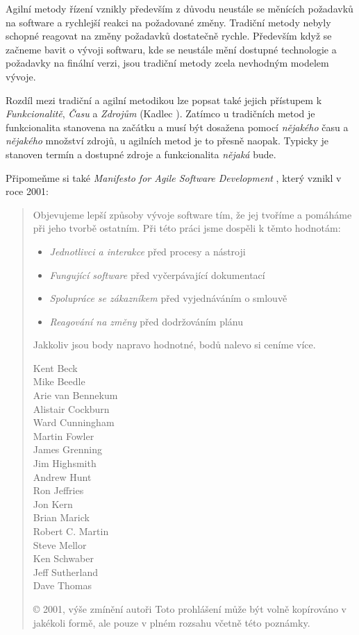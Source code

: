 Agilní metody řízení vznikly především z důvodu neustále se měnících požadavků na software a rychlejší reakci na požadované změny. Tradiční metody nebyly schopné reagovat na změny požadavků dostatečně rychle. Především když se začneme bavit o vývoji softwaru, kde se neustále mění dostupné technologie a požadavky na finální verzi, jsou tradiční metody zcela nevhodným modelem vývoje.

Rozdíl mezi tradiční a agilní metodikou lze popsat také jejich přístupem k \emph{Funkcionalitě}, \emph{Času} a \emph{Zdrojům} (Kadlec \cite{kadlec}). Zatímco u tradičních metod je funkcionalita stanovena na začátku a musí být dosažena pomocí \emph{nějakého} času a \emph{nějakého} množství zdrojů, u agilních metod je to přesně naopak. Typicky je stanoven termín a dostupné zdroje a funkcionalita \emph{nějaká} bude.

Připomeňme si také \emph{Manifesto for Agile Software Development} \cite{manifesto}, který vznikl v roce 2001:

\begin{quote}
Objevujeme lepší způsoby vývoje software tím,
že jej tvoříme a pomáháme při jeho tvorbě ostatním.
Při této práci jsme dospěli k těmto hodnotám:
\begin{itemize}
	\item \emph{Jednotlivci a interakce} před procesy a nástroji
	\item \emph{Fungující software} před vyčerpávající dokumentací
	\item \emph{Spolupráce se zákazníkem} před vyjednáváním o smlouvě
	\item \emph{Reagování na změny} před dodržováním plánu
\end{itemize}
Jakkoliv jsou body napravo hodnotné,
bodů nalevo si ceníme více.

\begin{multicols}{3}
Kent Beck\\
Mike Beedle\\
Arie van Bennekum\\
Alistair Cockburn\\
Ward Cunningham\\
Martin Fowler\\
James Grenning\\
Jim Highsmith\\
Andrew Hunt\\
Ron Jeffries\\
Jon Kern\\
Brian Marick\\
Robert C. Martin\\
Steve Mellor\\
Ken Schwaber\\
Jeff Sutherland\\
Dave Thomas\\
\end{multicols}

{\color{gray}
© 2001, výše zmínění autoři
Toto prohlášení může být volně kopírováno v jakékoli formě,
ale pouze v plném rozsahu včetně této poznámky.
}

\end{quote}


